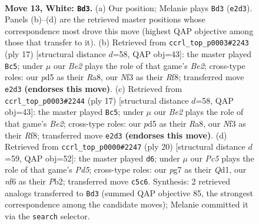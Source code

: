 \documentclass[11pt]{article}
\begin{document}
\clearpage

\begin{figure}[p]\centering
\begin{subfigure}{0.46\textwidth}\centering
\resizebox{\linewidth}{!}{%
\newchessgame
\chessboard[
  setfen={rnqbr1k1/pp1b1ppp/4pn2/2Pp4/N2P4/5N2/PP1BBPPP/2RQ1RK1 w - - 11 13},
  showmover=false,
  pgfstyle=straightmove, color=movearrow, markmove={e2-d3}
]}
\caption{}
\end{subfigure}\hfill
\begin{subfigure}{0.46\textwidth}\centering
\resizebox{\linewidth}{!}{%
\newchessgame
\chessboard[
  setfen={r1bq1rk1/ppp1bppp/2n2n2/4p3/4P3/1BP2N2/PP1N1PPP/R1BQ1RK1 b - - 0 9},
  showmover=false,
  pgfstyle=straightmove, color=movearrow, markmove={e7-c5}
]}
\caption{}
\end{subfigure}
\\[4pt]
\begin{subfigure}{0.46\textwidth}\centering
\resizebox{\linewidth}{!}{%
\newchessgame
\chessboard[
  setfen={r1bq1rk1/ppp1bppp/2n2n2/4p3/4P3/1BP2N2/PP1N1PPP/R1BQ1RK1 b - - 0 9},
  showmover=false,
  pgfstyle=straightmove, color=movearrow, markmove={e7-c5}
]}
\caption{}
\end{subfigure}\hfill
\begin{subfigure}{0.46\textwidth}\centering
\resizebox{\linewidth}{!}{%
\newchessgame
\chessboard[
  setfen={r1bq1rk1/pp2ppbp/1n3np1/3P4/3N4/2N1B3/PPP1BPPP/R2Q1RK1 w - - 1 11},
  showmover=false,
  pgfstyle=straightmove, color=movearrow, markmove={d5-d6}
]}
\caption{}
\end{subfigure}
\caption{\textbf{Move 13, White: \texttt{Bd3}.} (a) Our position; Melanie plays \texttt{Bd3} (\texttt{e2d3}). Panels (b)--(d) are the retrieved master positions whose correspondence most drove this move (highest QAP objective among those that transfer to it). (b) Retrieved from \texttt{ccrl\_top\_p0003\#2243} (ply 17) [structural distance $d$=58, QAP obj=43]: the master played \texttt{Bc5}; under $\mu$ our \emph{Be2} plays the role of that game's \emph{Be2}; cross-type roles: our \emph{p}d5 as their \emph{R}a8, our \emph{N}f3 as their \emph{R}f8; transferred move \texttt{e2d3} \textbf{(endorses this move)}. (c) Retrieved from \texttt{ccrl\_top\_p0003\#2244} (ply 17) [structural distance $d$=58, QAP obj=43]: the master played \texttt{Bc5}; under $\mu$ our \emph{Be2} plays the role of that game's \emph{Be2}; cross-type roles: our \emph{p}d5 as their \emph{R}a8, our \emph{N}f3 as their \emph{R}f8; transferred move \texttt{e2d3} \textbf{(endorses this move)}. (d) Retrieved from \texttt{ccrl\_top\_p0000\#2247} (ply 20) [structural distance $d$=59, QAP obj=52]: the master played \texttt{d6}; under $\mu$ our \emph{Pc5} plays the role of that game's \emph{Pd5}; cross-type roles: our \emph{p}g7 as their \emph{Q}d1, our \emph{n}f6 as their \emph{P}b2; transferred move \texttt{c5c6}. Synthesis: 2 retrieved analogs transferred to \texttt{Bd3} (summed QAP objective 85, the strongest correspondence among the candidate moves); Melanie committed it via the \texttt{search} selector.}
\label{fig:thought-m24}
\end{figure}
\end{document}
